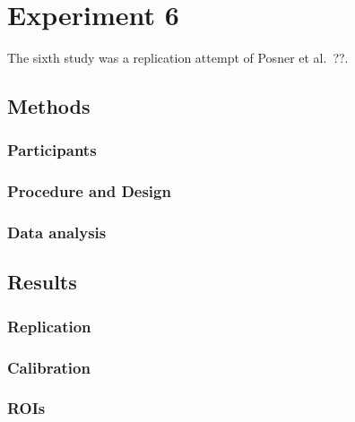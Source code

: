 \documentclass[
  english,
  man,floatsintext]{apa6}
\begin{document}
\hypertarget{experiment-6}{%
\section{Experiment 6}\label{experiment-6}}

The sixth study was a replication attempt of Posner et al.~??.

\hypertarget{methods-5}{%
\subsection{Methods}\label{methods-5}}

\hypertarget{participants-6}{%
\subsubsection{Participants}\label{participants-6}}

\hypertarget{procedure-and-design-1}{%
\subsubsection{Procedure and Design}\label{procedure-and-design-1}}

\hypertarget{data-analysis-3}{%
\subsubsection{Data analysis}\label{data-analysis-3}}

\hypertarget{results-5}{%
\subsection{Results}\label{results-5}}

\hypertarget{replication-3}{%
\subsubsection{Replication}\label{replication-3}}

\hypertarget{calibration-3}{%
\subsubsection{Calibration}\label{calibration-3}}

\hypertarget{rois}{%
\subsubsection{ROIs}\label{rois}}
\end{document}
